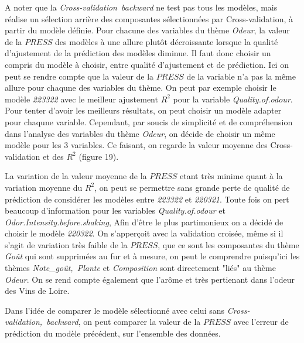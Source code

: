 \documentclass[a4paper,french,10pt]{article}
\begin{document}
A noter que la \textit{Cross-validation~backward} ne test pas tous les modèles, mais réalise un sélection arrière des composantes sélectionnées par Cross-validation, à partir du modèle définie. \newline
Pour chacune des variables du thème \textit{Odeur}, la valeur de la $PRESS$ des modèles à une allure plutôt décroissante lorsque la qualité d'ajustement de la prédiction des modèles diminue. Il faut donc choisir un compris du modèle à choisir, entre qualité d'ajustement et de prédiction. \newline
Ici on peut se rendre compte que la valeur de la $PRESS$ de la variable n'a pas la même allure pour chaqune des variables du thème. On peut par exemple choisir le modèle \textit{223322} avec le meilleur ajustement $R^2$ pour la variable \textit{Quality.of.odour}.\newline
Pour tenter d'avoir les meilleurs résultats, on peut choisir un modèle adapter pour chaqune variable. Cependant, par soucis de simplicité et de compréhension dans l'analyse des variables du thème \textit{Odeur}, on décide de choisir un même modèle pour les 3 variables. Ce faisant, on regarde la valeur moyenne des Cross-validation et des $R^2$ (figure 19).\newline

La variation de la valeur moyenne de la $PRESS$ etant très minime quant à la variation moyenne du $R^2$, on peut se permettre sans grande perte de qualité de prédiction de considérer les modèles entre \textit{223322} et \textit{220321}. Toute fois on pert beaucoup d'information pour les variables \textit{Quality.of.odour} et \textit{Odor.Intensity.before.shaking}, Afin d'être le plus partimonieux on a décidé de choisir le modèle \textit{220322}. \newline
On s'apperçoit avec la validation croisée, même si il s'agit de variation très faible de la $PRESS$, que ce sont les composantes du thème \textit{Goût} qui sont supprimées au fur et à mesure, on peut le comprendre puisqu'ici les thèmes \textit{Note\_goût,~Plante} et \textit{Composition} sont directement "liés" au thème \textit{Odeur}. On se rend compte également que l'arôme et très pertienant dans l'odeur des Vins de Loire. \newline

Dans l'idée de comparer le modèle sélectionné avec celui sans \textit{Cross-validation,~backward}, on peut comparer la valeur de la $PRESS$ avec l'erreur de prédiction du modèle précédent, sur l'ensemble des données. \newline
\end{document}
